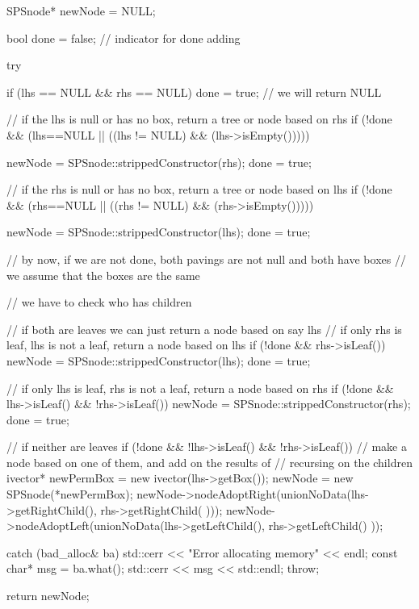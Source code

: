 \begin{DoxyCode}
    {
        SPSnode* newNode = NULL;

        bool done = false;  // indicator for done adding

        try {

            if (lhs == NULL && rhs == NULL) done = true; // we will return NULL

            // if the lhs is null or has no box, return a tree or node based on
       rhs
            if (!done && (lhs==NULL || ((lhs != NULL) && (lhs->isEmpty())))) {

                newNode = SPSnode::strippedConstructor(rhs);
                done = true;
            }

            // if the rhs is null or has no box, return a tree or node based on
       lhs
            if (!done && (rhs==NULL || ((rhs != NULL) && (rhs->isEmpty())))) {

                newNode = SPSnode::strippedConstructor(lhs);
                done = true;
            }

            // by now, if we are not done, both pavings are not null and both
       have boxes
            // we assume that the boxes are the same

            // we have to check who has children

            // if both are leaves we can just return a node based on say lhs
             // if only rhs is leaf, lhs is not a leaf, return a node based on
       lhs
            if (!done && rhs->isLeaf()) {
                newNode = SPSnode::strippedConstructor(lhs);
                done = true;
            }

            // if only lhs is leaf, rhs is not a leaf, return a node based on
       rhs
            if (!done && lhs->isLeaf() && !rhs->isLeaf()) {
                newNode = SPSnode::strippedConstructor(rhs);
                done = true;
            }

            // if neither are leaves
            if (!done && !lhs->isLeaf() && !rhs->isLeaf()) {
                // make a node based on one of them, and add on the results of
                // recursing on the children
                ivector* newPermBox = new ivector(lhs->getBox());
                newNode = new SPSnode(*newPermBox);
                newNode->nodeAdoptRight(unionNoData(lhs->getRightChild(),
                                                            rhs->getRightChild(
      )));
                newNode->nodeAdoptLeft(unionNoData(lhs->getLeftChild(),
                                                            rhs->getLeftChild()
      ));
            }
        }
        catch (bad_alloc& ba) {
            std::cerr << "Error allocating memory" << endl;
            const char* msg = ba.what();
            std::cerr << msg << std::endl;
            throw;
        }

        return newNode;

    }
\end{DoxyCode}
